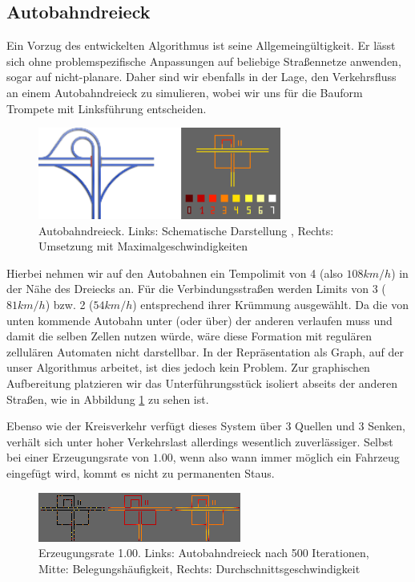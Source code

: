 \documentclass[10pt, a4paper]{article}
\newcommand\q[1]{\glqq{}#1\grqq{}}
\begin{document}
\subsection{Autobahndreieck}
Ein Vorzug des entwickelten Algorithmus ist seine Allgemeingültigkeit. Er lässt sich ohne problemspezifische Anpassungen auf beliebige Straßennetze anwenden, sogar auf nicht-planare. Daher sind wir ebenfalls in der Lage, den Verkehrsfluss an einem Autobahndreieck zu simulieren, wobei wir uns für die Bauform \q{Trompete} mit Linksführung entscheiden.

\begin{figure}[h!]
	\centering
	\includegraphics[width=8cm]{img/interchangeTrumpetSpeedLimits}
	\caption{Autobahndreieck. Links: Schematische Darstellung \cite{wiki:trumpetInterchange}, Rechts: Umsetzung mit Maximalgeschwindigkeiten}
	\label{fig:interchangeTrumpet}
\end{figure}

Hierbei nehmen wir auf den Autobahnen ein Tempolimit von 4 (also $108km/h$) in der Nähe des Dreiecks an. Für die Verbindungsstraßen werden Limits von 3 ($81km/h$) bzw. 2 ($54km/h$) entsprechend ihrer Krümmung ausgewählt. Da die von unten kommende Autobahn unter (oder über) der anderen verlaufen muss und damit die selben Zellen nutzen würde, wäre diese Formation mit regulären zellulären Automaten nicht darstellbar. In der Repräsentation als Graph, auf der unser Algorithmus arbeitet, ist dies jedoch kein Problem. Zur graphischen Aufbereitung platzieren wir das Unterführungsstück isoliert abseits der anderen Straßen, wie in Abbildung \ref{fig:interchangeTrumpet} zu sehen ist.

Ebenso wie der Kreisverkehr verfügt dieses System über 3 Quellen und 3 Senken, verhält sich unter hoher Verkehrslast allerdings wesentlich zuverlässiger. Selbst bei einer Erzeugungsrate von $1.00$, wenn also wann immer möglich ein Fahrzeug eingefügt wird, kommt es nicht zu permanenten Staus.

\begin{figure}[h!]
	\centering
	\includegraphics[width=\textwidth]{img/interchangeTrumpet_100}
	\caption{Erzeugungsrate 1.00. Links: Autobahndreieck nach 500 Iterationen, Mitte: Belegungshäufigkeit, Rechts: Durchschnittsgeschwindigkeit}
	\label{fig:interchangeTrumpet100}
\end{figure}
\end{document}
